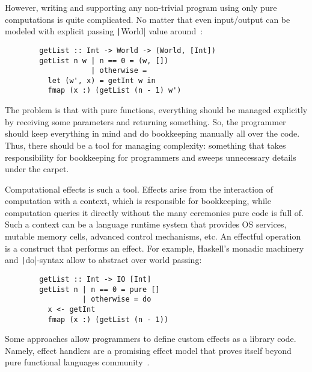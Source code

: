 \documentclass[conference]{IEEEtran}
\begin{document}
    However, writing and supporting any non-trivial program using only pure computations is quite complicated.
    No matter that even input/output can be modeled with explicit passing \texttt|World| value around~\cite{peyton1993imperative}:

    \begin{verbatim}
        getList :: Int -> World -> (World, [Int])
        getList n w | n == 0 = (w, [])
                    | otherwise =
          let (w', x) = getInt w in
          fmap (x :) (getList (n - 1) w')
    \end{verbatim}

    The problem is that with pure functions, everything should be managed explicitly by receiving some parameters and returning something.
    So, the programmer should keep everything in mind and do bookkeeping manually all over the code.
    Thus, there should be a tool for managing complexity: something that takes responsibility for bookkeeping for programmers and sweeps unnecessary details under the carpet.

    Computational effects is such a tool.
    Effects arise from the interaction of computation with a context, which is responsible for bookkeeping, while computation queries it directly without the many ceremonies pure code is full of.
    Such a context can be a language runtime system that provides OS services, mutable memory cells, advanced control mechanisms, etc.
    An effectful operation is a construct that performs an effect.
    For example, Haskell's monadic machinery and \texttt|do|-syntax allow to abstract over world passing:

    \begin{verbatim}
        getList :: Int -> IO [Int]
        getList n | n == 0 = pure []
                  | otherwise = do
          x <- getInt
          fmap (x :) (getList (n - 1))
    \end{verbatim}

    Some approaches allow programmers to define custom effects as a library code.
    Namely, effect handlers are a promising effect model that proves itself beyond pure functional languages community~\cite{plotkin2013handling, chandrasekaran2018algebraic}.

%
\end{document}
